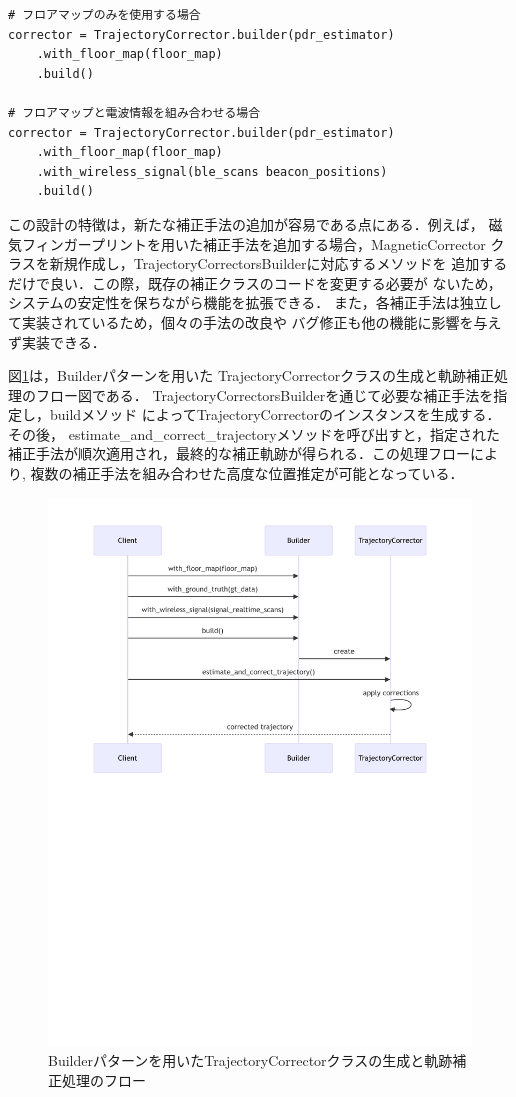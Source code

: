 \begin{lstlisting}[caption={TrajectoryCorrectorの使用例},label=lst:trajectory-corrector,float=h]
# フロアマップのみを使用する場合
corrector = TrajectoryCorrector.builder(pdr_estimator)
    .with_floor_map(floor_map)
    .build()

# フロアマップと電波情報を組み合わせる場合
corrector = TrajectoryCorrector.builder(pdr_estimator)
    .with_floor_map(floor_map)
    .with_wireless_signal(ble_scans beacon_positions)
    .build()
\end{lstlisting}

この設計の特徴は，新たな補正手法の追加が容易である点にある．例えば，
磁気フィンガープリントを用いた補正手法を追加する場合，MagneticCorrector
クラスを新規作成し，TrajectoryCorrectorsBuilderに対応するメソッドを
追加するだけで良い．この際，既存の補正クラスのコードを変更する必要が
ないため，システムの安定性を保ちながら機能を拡張できる．
また，各補正手法は独立して実装されているため，個々の手法の改良や
バグ修正も他の機能に影響を与えず実装できる．

図\ref{fig:corrector-sequence}は，Builderパターンを用いた
TrajectoryCorrectorクラスの生成と軌跡補正処理のフロー図である．
TrajectoryCorrectorsBuilderを通じて必要な補正手法を指定し，buildメソッド
によってTrajectoryCorrectorのインスタンスを生成する．その後，
estimate\_and\_correct\_trajectoryメソッドを呼び出すと，指定された
補正手法が順次適用され，最終的な補正軌跡が得られる．この処理フローにより,
複数の補正手法を組み合わせた高度な位置推定が可能となっている．

\begin{figure}[H]
    \centering
    \includegraphics[width=\linewidth]{../image/corrector-flow-diagram.pdf}
    \caption{Builderパターンを用いたTrajectoryCorrectorクラスの生成と軌跡補正処理のフロー}
    \label{fig:corrector-sequence}
\end{figure}
